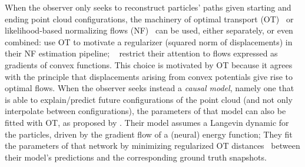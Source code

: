 When the observer only seeks to reconstruct particles' paths given starting and ending point cloud configurations, the machinery of optimal transport (OT)~\citep{schiebinger2019optimal,yang2020predicting,yang2018scalable} or likelihood-based normalizing flows (NF)~\citep{rezende2015variational,grathwohl2018ffjord} can be used, either separately, or even combined: \citet{tong2020trajectorynet} use OT to motivate a regularizer (squared norm of displacements) in their NF estimation pipeline; ~\citet{huang2021convex} restrict their attention to flows expressed as gradients of convex functions. This choice is motivated by OT because it agrees with the \citet{brenier1987decomposition} principle that displacements arising from convex potentials give rise to optimal flows.
When the observer seeks instead a \textit{causal model}, namely one that is able to explain/predict future configurations of the point cloud (and not only interpolate between configurations), the parameters of that model can also be fitted with OT, as proposed by \citet{hashimoto2016learning}. Their model assumes a Langevin dynamic for the particles, driven by the gradient flow of a (neural) energy function; They fit the parameters of that network by minimizing regularized OT distances~\citep{cuturi2013sinkhorn} between their model's predictions and the corresponding ground truth snapshots. \\

